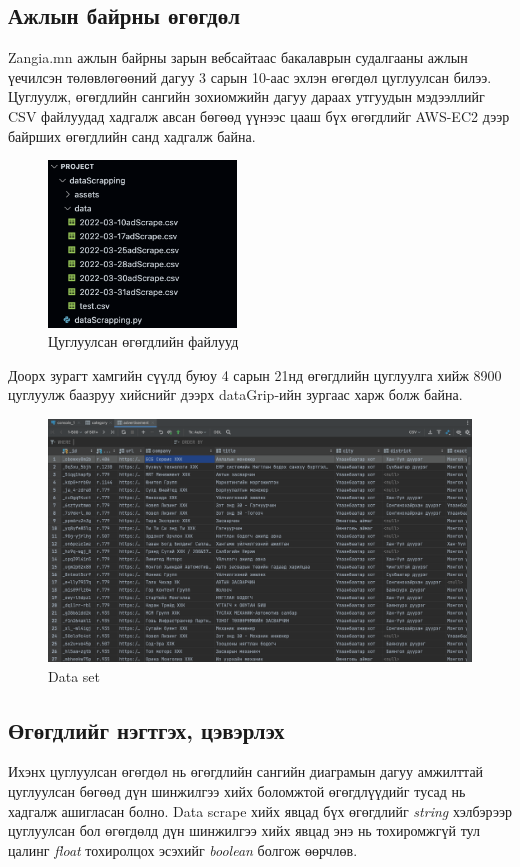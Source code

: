 \subsection{Ажлын байрны өгөгдөл}
Zangia.mn ажлын байрны зарын вебсайтаас бакалаврын судалгааны ажлын үечилсэн төлөвлөгөөний дагуу 3 сарын 10-аас эхлэн өгөгдөл цуглуулсан билээ. Цуглуулж, өгөгдлийн сангийн зохиомжийн дагуу дараах утгуудын мэдээллийг CSV файлуудад хадгалж авсан бөгөөд үүнээс цааш бүх өгөгдлийг AWS-EC2 дээр байрших өгөгдлийн санд хадгалж байна.  
\begin{figure}[ht]
  \centering
  \includegraphics[width=5cm]{images/allData.png}
  \caption{Цуглуулсан өгөгдлийн файлууд}\label{fig:dataSet}
\end{figure}
Доорх зурагт хамгийн сүүлд буюу 4 сарын 21нд өгөгдлийн цуглуулга хийж 8900 цуглуулж баазруу хийснийг дээрх dataGrip-ийн зургаас харж болж байна. 
\begin{figure}[ht]
  \centering
  \includegraphics[width=\textwidth-4cm]{images/dataSet.png}
  \caption{Data set}\label{fig:dataSet1}
\end{figure}
\subsection{Өгөгдлийг нэгтгэх, цэвэрлэх}
Ихэнх цуглуулсан өгөгдөл нь өгөгдлийн сангийн диаграмын дагуу амжилттай цуглуулсан бөгөөд дүн шинжилгээ хийх боломжтой өгөгдлүүдийг тусад нь хадгалж ашигласан болно. Data scrape хийх явцад бүх өгөгдлийг \textit{string} хэлбэрээр цуглуулсан бол өгөгдөлд дүн шинжилгээ хийх явцад энэ нь тохиромжгүй тул цалинг \textit{float} тохиролцох эсэхийг \textit{boolean} болгож өөрчлөв. 

\newpage
